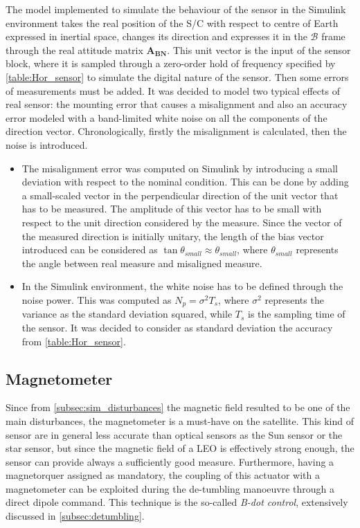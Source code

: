 The model implemented to simulate the behaviour of the sensor in the Simulink environment takes the real position of the S/C with respect to centre of Earth expressed in inertial space, changes its direction and expresses it in the $\mathcal{B}$ frame through the real attitude matrix $\boldsymbol{A_{BN}}$. 
This unit vector is the input of the sensor block, where it is sampled through a zero-order hold of frequency specified by
\autoref{table:Hor_sensor} to simulate the digital nature of the sensor. Then some errors of measurements must be added.
It was decided to model two typical effects of real sensor: the mounting error that causes a misalignment and also an accuracy error modeled with a band-limited white noise on all the components of the direction vector.
Chronologically, firstly the misalignment is calculated, then the noise is introduced.
\begin{itemize}[wide,itemsep=3pt,topsep=3pt]
    \item The misalignment error was computed on Simulink by introducing a small deviation with respect to the nominal condition. This can
    be done by adding a small-scaled vector in the perpendicular direction of the unit vector that has to be measured. The amplitude of 
    this vector has to be small with respect to the unit direction considered by the measure. Since the vector of the measured 
    direction is initially unitary, the length of the bias vector introduced can be considered as $\tan{\theta_{small}} \approx \theta_{small}$,
    where $\theta_{small}$ represents the angle between real measure and misaligned measure.
    \item In the Simulink environment, the white noise has to be defined through the noise power. This was computed as $N_p = \sigma^2 {T_s} $, 
    where $\sigma^2$ represents the variance as the standard deviation squared, while $T_s$ is the sampling time of the sensor.
    It was decided to consider as standard deviation the accuracy from \autoref{table:Hor_sensor}.
\end{itemize}


\subsection{Magnetometer}
\label{subsec:magnetometer}

Since from \autoref{subsec:sim_disturbances} the magnetic field resulted to be one of the main disturbances, the magnetometer is a must-have on the satellite. This kind of sensor are in general less accurate 
than optical sensors as the Sun sensor or the star sensor, but since the magnetic field of a LEO is effectively strong enough, the sensor can provide always a sufficiently good measure. Furthermore, having a magnetorquer assigned as mandatory, the coupling of this actuator with a magnetometer can be exploited during 
the de-tumbling manoeuvre through a direct dipole command. This technique is the so-called \textit{B-dot control}, extensively discussed in \autoref{subsec:detumbling}.


